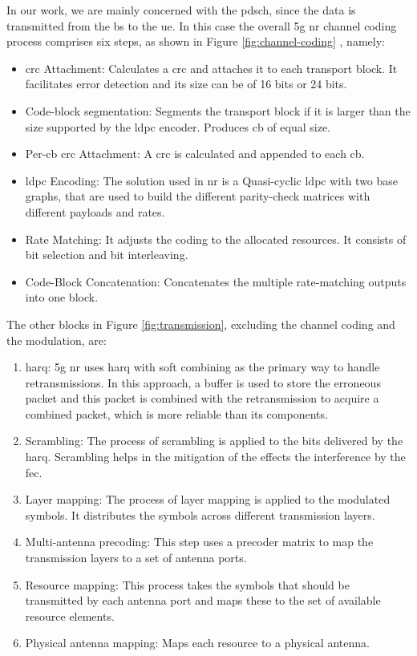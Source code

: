 In our work, we are mainly concerned with the \gls{pdsch}, since the data is transmitted from the \gls{bs} to the \gls{ue}.
%
In this case the overall \gls{5g} \gls{nr} channel coding process comprises six steps, as shown in Figure \ref{fig:channel-coding} \cite{ErikDahlman5G}, namely:
\begin{itemize}
	\item \Gls{crc} Attachment: Calculates a \gls{crc} and attaches it to each transport block. It facilitates error detection and its size can be of 16 bits or 24 bits.
	\item Code-block segmentation: Segments the transport block if it is larger than the size supported by the \gls{ldpc} encoder. Produces \gls{cb} of equal size.
	\item Per-\gls{cb} \gls{crc} Attachment: A \gls{crc} is calculated and appended to each \gls{cb}.
	\item \gls{ldpc} Encoding: The solution used in \gls{nr} is a Quasi-cyclic \gls{ldpc} with two base graphs, that are used to build the different parity-check matrices with different payloads and rates.
	\item Rate Matching: It adjusts the coding to the allocated resources. It consists of bit selection and bit interleaving.
	\item Code-Block Concatenation: Concatenates the multiple rate-matching outputs into one block.
\end{itemize}

The other blocks in Figure \ref{fig:transmission}, excluding the channel coding and the modulation, are:
\begin{enumerate}
	\item \Gls{harq}: \gls{5g} \gls{nr} uses \gls{harq} with soft combining as the primary way to handle retransmissions. In this approach, a buffer is used to store the erroneous packet and this packet is combined with the retransmission to acquire a combined packet, which is more reliable than its components.
	\item Scrambling: The process of scrambling is applied to the bits delivered by the \gls{harq}. Scrambling helps in the mitigation of the effects the interference by the \gls{fec}.
	\item Layer mapping: The process of layer mapping is applied to the modulated symbols. It distributes the symbols across different transmission layers.
	\item Multi-antenna precoding: This step uses a precoder matrix to map the transmission layers to a set of antenna ports.
	\item Resource mapping: This process takes the symbols that should be transmitted by each antenna port and maps these to the set of available resource elements.
	\item Physical antenna mapping: Maps each resource to a physical antenna.
\end{enumerate}

